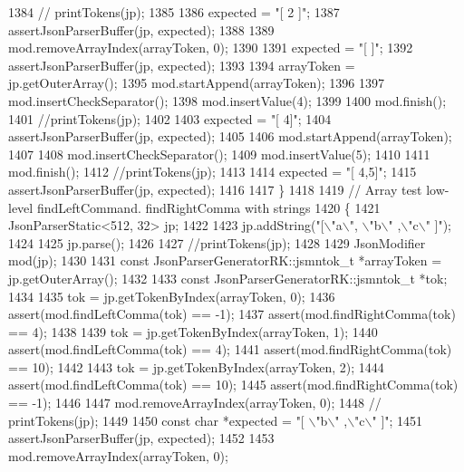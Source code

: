 \begin{DoxyCode}
{{{{{{{{{{{{{{{{{{{{{1384         \textcolor{comment}{// printTokens(jp);}
1385 
1386         expected = \textcolor{stringliteral}{"[ 2 ]"};
1387         assertJsonParserBuffer(jp, expected);
1388 
1389         mod.removeArrayIndex(arrayToken, 0);
1390 
1391         expected = \textcolor{stringliteral}{"[  ]"};
1392         assertJsonParserBuffer(jp, expected);
1393 
1394         arrayToken = jp.getOuterArray();
1395         mod.startAppend(arrayToken);
1396 
1397         mod.insertCheckSeparator();
1398         mod.insertValue(4);
1399 
1400         mod.finish();
1401         \textcolor{comment}{//printTokens(jp);}
1402 
1403         expected = \textcolor{stringliteral}{"[  4]"};
1404         assertJsonParserBuffer(jp, expected);
1405 
1406         mod.startAppend(arrayToken);
1407 
1408         mod.insertCheckSeparator();
1409         mod.insertValue(5);
1410 
1411         mod.finish();
1412         \textcolor{comment}{//printTokens(jp);}
1413 
1414         expected = \textcolor{stringliteral}{"[  4,5]"};
1415         assertJsonParserBuffer(jp, expected);
1416 
1417     \}
1418 
1419     \textcolor{comment}{// Array test low-level findLeftCommand. findRightComma with strings}
1420     \{
1421         JsonParserStatic<512, 32> jp;
1422 
1423         jp.addString(\textcolor{stringliteral}{"[\(\backslash\)"a\(\backslash\)", \(\backslash\)"b\(\backslash\)" ,\(\backslash\)"c\(\backslash\)" ]"});
1424 
1425         jp.parse();
1426 
1427         \textcolor{comment}{//printTokens(jp);}
1428 
1429         JsonModifier mod(jp);
1430 
1431         \textcolor{keyword}{const} JsonParserGeneratorRK::jsmntok_t *arrayToken = jp.getOuterArray();
1432 
1433         \textcolor{keyword}{const} JsonParserGeneratorRK::jsmntok_t *tok;
1434 
1435         tok = jp.getTokenByIndex(arrayToken, 0);
1436         assert(mod.findLeftComma(tok) == -1);
1437         assert(mod.findRightComma(tok) == 4);
1438 
1439         tok = jp.getTokenByIndex(arrayToken, 1);
1440         assert(mod.findLeftComma(tok) == 4);
1441         assert(mod.findRightComma(tok) == 10);
1442 
1443         tok = jp.getTokenByIndex(arrayToken, 2);
1444         assert(mod.findLeftComma(tok) == 10);
1445         assert(mod.findRightComma(tok) == -1);
1446 
1447         mod.removeArrayIndex(arrayToken, 0);
1448         \textcolor{comment}{// printTokens(jp);}
1449 
1450         \textcolor{keyword}{const} \textcolor{keywordtype}{char} *expected = \textcolor{stringliteral}{"[ \(\backslash\)"b\(\backslash\)" ,\(\backslash\)"c\(\backslash\)" ]"};
1451         assertJsonParserBuffer(jp, expected);
1452 
1453         mod.removeArrayIndex(arrayToken, 0);
}}}}}}}}}}}}}}}}}}}}}
\end{DoxyCode}
